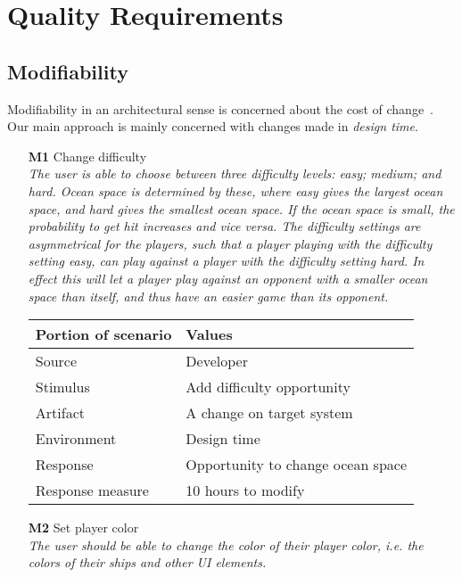 \chapter{Quality Requirements}

\section{Modifiability}
Modifiability in an architectural sense is concerned about the cost of change \cite{pensum}. Our main approach is mainly concerned with changes made in \emph{design time}.

    \begin{itemize}
        \item[\textbf{M1}] Change difficulty \\
        \textit{\small{The user is able to choose between three difficulty levels: easy; medium; and hard. Ocean space is determined by these, where easy gives the largest ocean space, and hard gives the smallest ocean space. If the ocean space is small, the probability to get hit increases and vice versa. The difficulty settings are asymmetrical for the players, such that a player playing with the difficulty setting \emph{easy}, can play against a player with the difficulty setting \emph{hard}. In effect this will let a player play against an opponent with a smaller ocean space than itself, and thus have an easier game than its opponent.}}
        
        \begin{tabular}{| l | l |}
            \hline
            \rowcolor[gray]{0.8}
            \textbf{Portion of scenario} & \textbf{Values} \\
            \hline
            Source &  Developer \\
            Stimulus & Add difficulty opportunity \\
            Artifact & A change on target system \\
            Environment & Design time \\
            Response & Opportunity to change ocean space  \\
            Response measure & 10 hours to modify  \\
            \hline
        \end{tabular}
        
        \item[\textbf{M2}] Set player color \\
        \textit{\small{The user should be able to change the color of their player color, i.e. the colors of their ships and other UI elements.}}
        

\end{itemize}
